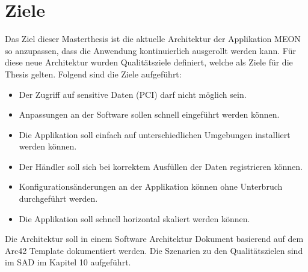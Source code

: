 \chapter{Ziele}

Das Ziel dieser Masterthesis ist die aktuelle Architektur der Applikation MEON so anzupassen, dass die Anwendung kontinuierlich ausgerollt werden kann. Für diese neue Architektur wurden Qualitätsziele definiert, welche als Ziele für die Thesis gelten. Folgend sind die Ziele aufgeführt:

\begin{itemize}
	\item Der Zugriff auf sensitive Daten (PCI) darf nicht möglich sein.
	\item Anpassungen an der Software sollen schnell eingeführt werden können.
	\item Die Applikation soll einfach auf unterschiedlichen Umgebungen installiert werden können.
	\item Der Händler soll sich bei korrektem Ausfüllen der Daten registrieren können.
	\item Konfigurationsänderungen an der Applikation können ohne Unterbruch durchgeführt werden.
	\item Die Applikation soll schnell horizontal skaliert werden können.
\end{itemize}
Die Architektur soll in einem Software Architektur Dokument basierend auf dem Arc42 Template dokumentiert werden. Die Szenarien zu den Qualitätszielen sind im SAD im Kapitel 10 aufgeführt.
